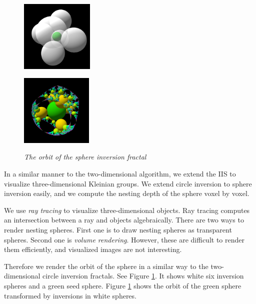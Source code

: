 \begin{figure}[htbp]
 \begin{minipage}[t]{0.5\hsize}
  \center
  \includegraphics[height=1.35in, keepaspectratio]{img/preparation/3dExtension/3dKissingGenerator.png}
  \label{fig:simpleGen}
  \hspace*{\fill}
 \end{minipage}
 \begin{minipage}[t]{0.5\hsize}
  \center
  \includegraphics[height=1.35in, keepaspectratio]{img/preparation/3dExtension/3dOrbit.png}
  \label{fig:simpleOrb}
  \hspace*{\fill}
 \end{minipage}
 \caption{\textit{The orbit of the sphere inversion fractal}}
 \label{fig:simpleGenOrb}
\end{figure}

In a similar manner to the two-dimensional algorithm,
we extend the IIS to visualize three-dimensional Kleinian groups.
We extend circle inversion to sphere inversion easily, and we
compute the nesting depth of the sphere voxel by voxel.

We use \textit{ray tracing} to visualize three-dimensional objects.
Ray tracing computes an intersection between a ray and objects
algebraically.
There are two ways to render nesting spheres. First one is to draw
nesting spheres as transparent spheres.
Second one is \textit{volume rendering}.
However, these are difficult to render them efficiently, and
visualized images are not interesting.

Therefore we render the orbit of the sphere in a similar way to the
two-dimensional circle inversion fractals.
See Figure \ref{fig:simpleGenOrb}. It shows
white six inversion spheres and a green seed sphere.
Figure \ref{fig:simpleGenOrb} shows the orbit of
the green sphere transformed by inversions in white spheres.

